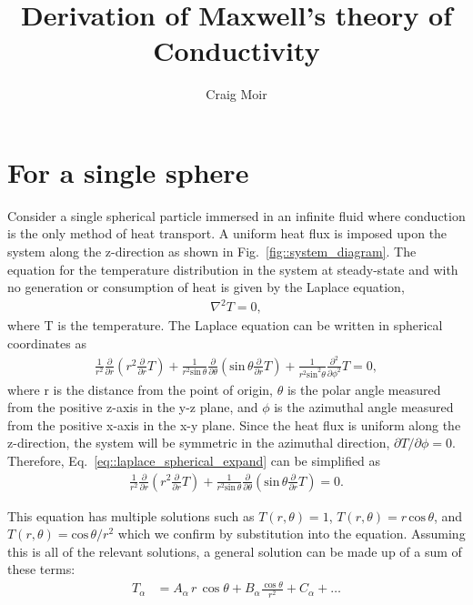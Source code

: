 \documentclass{article}
\begin{document}
\title{Derivation of Maxwell's theory of Conductivity}
\author{Craig Moir}
\maketitle

\section{For a single sphere}
Consider a single spherical particle immersed in an infinite fluid
where conduction is the only method of heat transport. A uniform heat
flux is imposed upon the system along the z-direction as shown in
Fig.~\ref{fig::system_diagram}. The equation for the temperature
distribution in the system at steady-state and with no generation or
consumption of heat is given by the Laplace equation,
\begin{align}
  \label{eq::laplace}
  \nabla^{2} T = 0,
\end{align}
where T is the temperature. The Laplace equation can be written in
spherical coordinates as
\begin{align}
  \label{eq::laplace_spherical_expand}
  \frac{1}{r^{2}} \frac{\partial}{\partial r} \left( r^{2} \frac{\partial}{\partial r} T \right) +
  \frac{1}{r^{2} \text{sin} \, \theta} \frac{\partial}{\partial \theta} \left(\text{sin} \, \theta \frac{\partial}{\partial r} T \right) +
  \frac{1}{r^{2} \text{sin}^{2} \theta} \frac{\partial^{2}}{\partial \phi^{2}} T
  = 0,
\end{align}
where r is the distance from the point of origin, $\theta$ is the
polar angle measured from the positive z-axis in the y-z plane, and
$\phi$ is the azimuthal angle measured from the positive x-axis in the
x-y plane. Since the heat flux is uniform along the z-direction, the
system will be symmetric in the azimuthal direction, $\partial T /
\partial \phi = 0$. Therefore, Eq.~\ref{eq::laplace_spherical_expand}
can be simplified as
\begin{align}
  \label{eq::laplace_spherical_expand_simplified}
  \frac{1}{r^{2}} \frac{\partial}{\partial r} \left( r^{2} \frac{\partial}{\partial r} T \right) +
  \frac{1}{r^{2} \text{sin} \, \theta} \frac{\partial}{\partial \theta} \left(\text{sin} \, \theta \frac{\partial}{\partial r} T \right)
  = 0.
\end{align}

This equation has multiple solutions such as $T(r, \theta)=1$,
$T(r, \theta) = r \, \text{cos} \, \theta$, and
$T(r, \theta) = \text{cos} \, \theta / r^{2}$ which we confirm by
substitution into the equation. Assuming this is all of the relevant
solutions, a general solution can be made up of a sum of these terms:
\begin{align}
  T_{\alpha} &= A_\alpha \, r\,\cos \theta +  B_\alpha\frac{\cos{\theta}}{r^{2}}  + C_\alpha + \ldots
\end{align}
\end{document}

